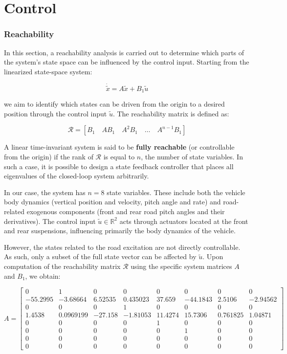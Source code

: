 \documentclass[]{report}
\begin{document}
\newpage
\section{Control}

\subsubsection{Reachability}




In this section, a reachability analysis is carried out to determine which parts of the system's state space can be influenced by the control input. Starting from the linearized state-space system:

\[
\dot{\tilde{x}} = A \tilde{x} + B_1 \tilde{u}
\]

we aim to identify which states can be driven from the origin to a desired position through the control input $\tilde{u}$. The reachability matrix is defined as:

\[
\mathcal{R} = \left[ B_1 \quad AB_1 \quad A^2B_1 \quad \dots \quad A^{n-1}B_1 \right]
\]

A linear time-invariant system is said to be \textbf{fully reachable} (or controllable from the origin) if the rank of $\mathcal{R}$ is equal to $n$, the number of state variables. In such a case, it is possible to design a state feedback controller that places all eigenvalues of the closed-loop system arbitrarily.


In our case, the system has $n = 8$ state variables. These include both the vehicle body dynamics (vertical position and velocity, pitch angle and rate) and road-related exogenous components (front and rear road pitch angles and their derivatives). The control input $\tilde{u} \in \mathbb{R}^2$ acts through actuators located at the front and rear suspensions, influencing primarily the body dynamics of the vehicle.

However, the states related to the road excitation are not directly controllable. As such, only a subset of the full state vector can be affected by $\tilde{u}$. Upon computation of the reachability matrix $\mathcal{R}$ using the specific system matrices $A$ and $B_1$, we obtain:


\[
A =
\begin{bmatrix}
	0 & 1 & 0 & 0 & 0 & 0 & 0 & 0 \\
	-55.2995 & -3.68664 & 6.52535 & 0.435023 & 37.659 & -44.1843 & 2.5106 & -2.94562 \\
	0 & 0 & 0 & 1 & 0 & 0 & 0 & 0 \\
	1.4538 & 0.0969199 & -27.158 & -1.81053 & 11.4274 & 15.7306 & 0.761825 & 1.04871 \\
	0 & 0 & 0 & 0 & 1 & 0 & 0 & 0 \\
	0 & 0 & 0 & 0 & 0 & 1 & 0 & 0 \\
	0 & 0 & 0 & 0 & 0 & 0 & 0 & 0 \\
	0 & 0 & 0 & 0 & 0 & 0 & 0 & 0 
\end{bmatrix}
\]
\end{document}
